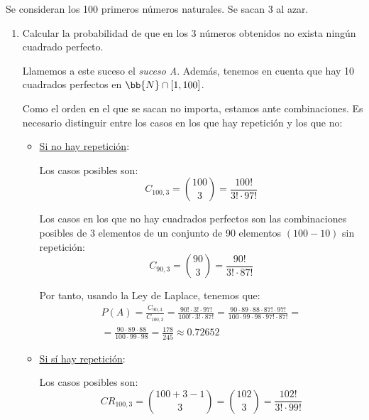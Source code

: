 \begin{ejercicio} \label{ej:3.Ejercicio7}
    Se consideran los 100 primeros números naturales. Se sacan 3 al azar.
    \begin{enumerate}
        \item Calcular la probabilidad de que en los 3 números obtenidos no exista ningún cuadrado perfecto.

        Llamemos a este suceso el \textit{suceso A}. Además, tenemos en cuenta que hay 10 cuadrados perfectos en $\bb{N}\cap [1,100]$.
        
        Como el orden en el que se sacan no importa, estamos ante combinaciones. Es necesario distinguir entre los casos en los que hay repetición y los que no:
        \begin{itemize}
            \item \underline{Si no hay repetición}:

            Los casos posibles son:
            \begin{equation*}
                C_{100,3}=\binom{100}{3}=\frac{100!}{3!\cdot 97!}
            \end{equation*}

            Los casos en los que no hay cuadrados perfectos son las combinaciones posibles de 3 elementos de un conjunto de 90 elementos $(100-10)$ sin repetición:
            \begin{equation*}
                C_{90,3}=\binom{90}{3}=\frac{90!}{3!\cdot 87!}
            \end{equation*}

            Por tanto, usando la Ley de Laplace, tenemos que:
            \begin{multline*}
                P(A)=\frac{C_{90,3}}{C_{100,3}}=\frac{90!\cdot 3!\cdot 97!}{100!\cdot 3!\cdot 87!}
                =\frac{90\cdot 89\cdot 88 \cdot 87!\cdot 97!}{100\cdot 99\cdot 98 \cdot 97!\cdot 87!}
                =\\=
                \frac{90\cdot 89\cdot 88}{100\cdot 99\cdot 98} = \frac{178}{245} \approx 0.72652
            \end{multline*}



            \item \underline{Si sí hay repetición}:

            Los casos posibles son:
            \begin{equation*}
                CR_{100,3}=\binom{100+3-1}{3}=\binom{102}{3}=\frac{102!}{3!\cdot 99!}
            \end{equation*}


\end{itemize}
\end{enumerate}
\end{ejercicio}
